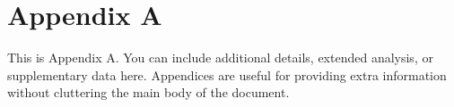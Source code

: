 \chapter*{Appendix A}

This is Appendix A. You can include additional details, extended analysis, or supplementary data here. Appendices are useful for providing extra information without cluttering the main body of the document.
